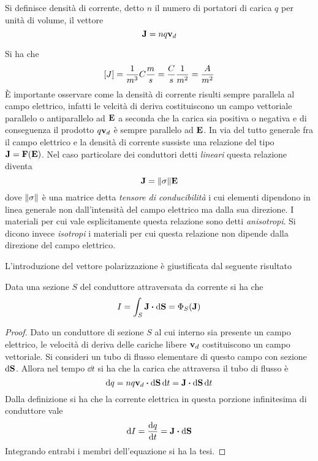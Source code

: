 \begin{defn}
Si definisce densità di corrente, detto $n$ il numero di portatori di carica $q$ per unità di volume, il vettore
\[
\vb{J}=nq\vb{v}_d
\]
\end{defn}
Si ha che
\[
[J]=\frac{1}{m^3}C\frac{m}{s}=\frac{C}{s}\frac{1}{m^2}=\frac{A}{m^2}
\]
È importante osservare come la densità di corrente risulti sempre parallela al campo elettrico, infatti
le velcità di deriva costituiscono un campo vettoriale parallelo o antiparallelo ad $\vb{E}$ a seconda che
la carica sia positiva o negativa e di conseguenza il prodotto $q\vb{v}_d$ è sempre parallelo ad $\vb{E}$.
In via del tutto generale fra il campo elettrico e la densità di corrente sussiste una relazione del tipo $\vb{J}=\vb{F}(\vb{E})$.
Nel caso particolare dei conduttori detti \textit{lineari} questa relazione diventa
\begin{equation}
    \label{eqn:rel_J_E}
    \vb{J}=\norm{\sigma}\vb{E}
\end{equation}
dove $\norm{\sigma}$ è una matrice detta \textit{tensore di conducibilità} i cui elementi dipendono in linea generale
non dall'intensità del campo elettrico ma dalla sua direzione. I materiali per cui vale esplicitamente questa relazione
sono detti \textit{anisotropi}. Si dicono invece \textit{isotropi}
i materiali per cui questa relazione non dipende dalla direzione del campo elettrico.

L'introduzione del vettore polarizzazione è giustificata dal seguente risultato
\begin{thm}
    \label{thm:I_flusso_J}
    Data una sezione $S$ del conduttore attraversata da corrente si ha che
    \[
        I=\int_S\vb{J}\vdot \dd{\vb{S}}=\Phi_S(\vb{J})
    \]
\end{thm}
\begin{proof}
    Dato un conduttore di sezione $S$ al cui interno sia presente un campo elettrico, le velocità di deriva delle cariche libere $\vb{v}_d$
    costituiscono un campo vettoriale. Si consideri un tubo di flusso elementare di questo campo con sezione $\dd{\vb{S}}$.
    Allora nel tempo $\dd{t}$ si ha che la carica che attraversa il tubo di flusso è
    \[
        \dd{q}=nq\vb{v}_d\vdot\dd{\vb{S}}\dd{t}=\vb{J}\vdot\dd{\vb{S}}\dd{t}
    \]
    Dalla definizione si ha che la corrente elettrica in questa porzione infinitesima di conduttore vale
    \[
        \dd{I}=\dv{q}{t}=\vb{J}\vdot\dd{\vb{S}}
    \]
    Integrando entrabi i membri dell'equazione si ha la tesi.
\end{proof}

